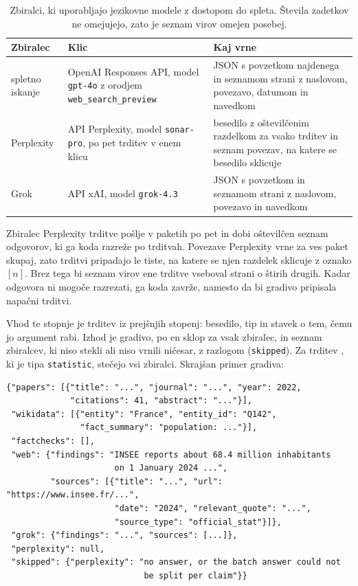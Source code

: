 \documentclass[a4paper, 12pt]{book}
\begin{document}
\begin{table}[H]
\centering
\small
{}
\begin{tabular}{@{}p{}p{}p{}@{}}
\toprule
Zbiralec & Klic & Kaj vrne \\
\midrule
spletno iskanje & OpenAI Responses API, model \texttt{gpt-4o} z orodjem \texttt{web\_search\_preview} & JSON s povzetkom najdenega in seznamom strani z naslovom, povezavo, datumom in navedkom \\
\midrule
Perplexity & API Perplexity, model \texttt{sonar-pro}, po pet trditev v enem klicu & besedilo z oštevilčenim razdelkom za vsako trditev in seznam povezav, na katere se besedilo sklicuje \\
\midrule
Grok & API xAI, model \texttt{grok-4.3} & JSON s povzetkom in seznamom strani z naslovom, povezavo in navedkom \\
\bottomrule
\end{tabular}
\caption{Zbiralci, ki uporabljajo jezikovne modele z dostopom do spleta. Števila zadetkov ne omejujejo, zato je seznam virov omejen posebej.}
\label{tbl:zbiralci-modeli}
\end{table}

Zbiralec Perplexity trditve pošlje v paketih po pet in dobi oštevilčen seznam odgovorov, ki ga koda razreže po trditvah. Povezave Perplexity vrne za ves paket skupaj, zato trditvi pripadajo le tiste, na katere se njen razdelek sklicuje z oznako $[n]$. Brez tega bi seznam virov ene trditve vseboval strani o štirih drugih. Kadar odgovora ni mogoče razrezati, ga koda zavrže, namesto da bi gradivo pripisala napačni trditvi.

Vhod te stopnje je trditev iz prejšnjih stopenj: besedilo, tip in stavek o tem, čemu jo argument rabi. Izhod je gradivo, po en sklop za vsak zbiralec, in seznam zbiralcev, ki niso stekli ali niso vrnili ničesar, z razlogom (\texttt{skipped}). Za trditev , ki je tipa \texttt{statistic}, stečejo vsi zbiralci. Skrajšan primer gradiva:

\begin{lstlisting}[basicstyle=\ttfamily\scriptsize,breaklines=true]
{"papers": [{"title": "...", "journal": "...", "year": 2022,
             "citations": 41, "abstract": "..."}],
 "wikidata": [{"entity": "France", "entity_id": "Q142",
               "fact_summary": "population: ..."}],
 "factchecks": [],
 "web": {"findings": "INSEE reports about 68.4 million inhabitants
                      on 1 January 2024 ...",
         "sources": [{"title": "...", "url": "https://www.insee.fr/...",
                      "date": "2024", "relevant_quote": "...",
                      "source_type": "official_stat"}]},
 "grok": {"findings": "...", "sources": [...]},
 "perplexity": null,
 "skipped": {"perplexity": "no answer, or the batch answer could not
                            be split per claim"}}
\end{lstlisting}
\end{document}
